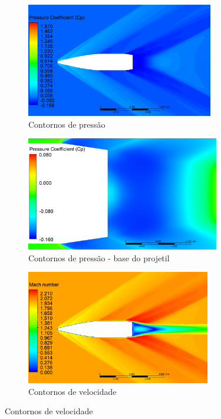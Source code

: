 \begin{figure}[!htpb]
	\centering
	\begin{subfigure}[b]{0.47\textwidth}
        \centering
        \includegraphics[height=5cm,width=\textwidth]{contorno-pressao.png}
        \caption{Contornos de pressão}
        \label{fig:contorno-pressao-sembasebleed}
    \end{subfigure}
    \hfill
    \begin{subfigure}[b]{0.47\textwidth}
        \centering    
        \includegraphics[height=5cm,width=\textwidth]{coeficientepressao-INERTE.png}
        \caption{Contornos de pressão - base do projetil}
        \label{fig:contorno-pressao-base-sembasebleed}
    \end{subfigure}
    \hfill
    \begin{subfigure}[b]{0.47\textwidth}
        \centering
        \includegraphics[height=5cm,width=\textwidth]{contorno-velocidade.png}
        \caption{Contornos de velocidade}
        \label{fig:contorno-velocidade-sembasebleed}
    \end{subfigure}

\end{figure}
